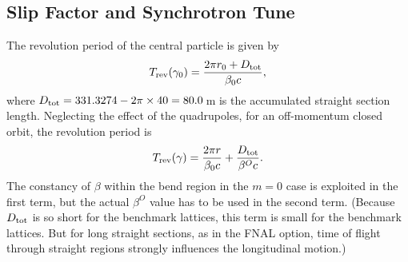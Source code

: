 \documentclass[]{article}
\begin{document}
\subsection{Slip Factor and Synchrotron Tune}
The revolution period of the central particle is given by
%
\begin{equation}
T_{\rm rev}(\gamma_0)
 =
\frac{2\pi r_0 + D_{\rm tot}}{\beta_0c},
\label{eq:SlipFac.1}
\end{equation}
%
where $D_{\rm tot}=331.3274-2\pi\times40=80.0$\,m is the accumulated 
straight section length. 
Neglecting the effect of the quadrupoles,
for an off-momentum closed orbit, the
revolution period is
%
\begin{equation}
T_{\rm rev}(\gamma)
 =
\frac{2\pi r}{\beta_0c} + \frac{D_{\rm tot}}{\beta^Oc}.
\label{eq:SlipFac.2}
\end{equation}
%
The constancy of $\beta$ within the bend region in the $m=0$ 
case is exploited in the first term, but the actual $\beta^O$
value has to be used in the second term. (Because $D_{\rm tot}$
is so short for the benchmark lattices, this term is small for
the benchmark lattices.  But for long straight sections, as in 
the FNAL option, time of flight through straight regions 
strongly influences the longitudinal motion.)
\end{document}
